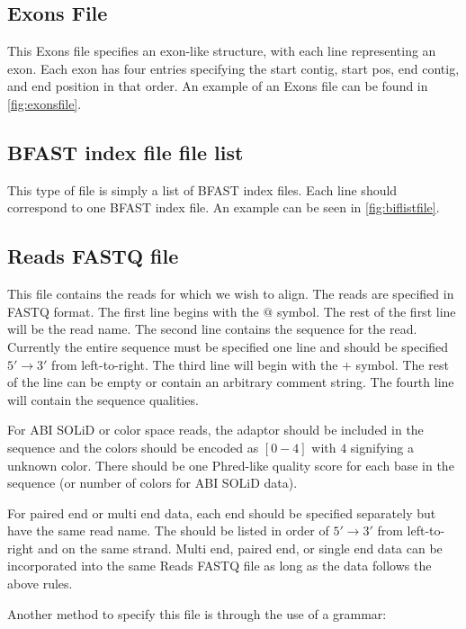\documentclass[a4paper,12pt]{book}
\newcommand{\RFF}{Reads FASTQ file}
\newcommand{\BIF}{BFAST index file} %
\newcommand{\FIVETOTHREE}{$5'\rightarrow3'$} %
\begin{document}
\subsection{Exons File}
\label{sec:exonsfile}
This Exons file specifies an exon-like structure, with each line representing an exon.
Each exon has four entries specifying the start contig, start pos, end contig, and end position in that order.
An example of an Exons file can be found in \autoref{fig:exonsfile}. 

\subsection{\BIF{} file list}
\label{sec:biflistfile}
This type of file is simply a list of \BIF{s}.
Each line should correspond to one \BIF{}.
An example can be seen in \autoref{fig:biflistfile}.
\subsection{\RFF{}}
\label{sec:rff}
This file contains the reads for which we wish to align.
The reads are specified in FASTQ format.
The first line begins with the $@$ symbol.
The rest of the first line will be the read name.
The second line contains the sequence for the read.
Currently the entire sequence must be specified one line and should be specified \FIVETOTHREE{} from left-to-right.
The third line will begin with the $+$ symbol.
The rest of the line can be empty or contain an arbitrary comment string.
The fourth line will contain the sequence qualities.

For ABI SOLiD or color space reads, the adaptor should be included in the sequence and the colors should be encoded as $[0-4]$ with $4$ signifying a unknown color.  
There should be one Phred-like quality score for each base in the sequence (or number of colors for ABI SOLiD data).

For paired end or multi end data, each end should be specified separately but have the same read name.
The should be listed in order of \FIVETOTHREE{} from left-to-right and on the same strand.
Multi end, paired end, or single end data can be incorporated into the same \RFF{} as long as the data follows the above rules.

Another method to specify this file is through the use of a grammar:

\newcommand{\blockfastq}{$<$fastq$>$}
\newcommand{\blockme}{$<$multi end block$>$}
\newcommand{\blockreadname}{$<$read name$>$}
\newcommand{\blocknewline}{$<$$\backslash$n$>$}
\newcommand{\blockseq}{$<$sequence$>$}
\newcommand{\blockseqnt}{$<$NT sequence$>$}
\newcommand{\blockseqcs}{$<$CS sequence$>$}
\newcommand{\blockinfo}{$<$info$>$}
\newcommand{\blockcomment}{$<$comment$>$}
\newcommand{\blockqual}{$<$qualities$>$}
\end{document}
